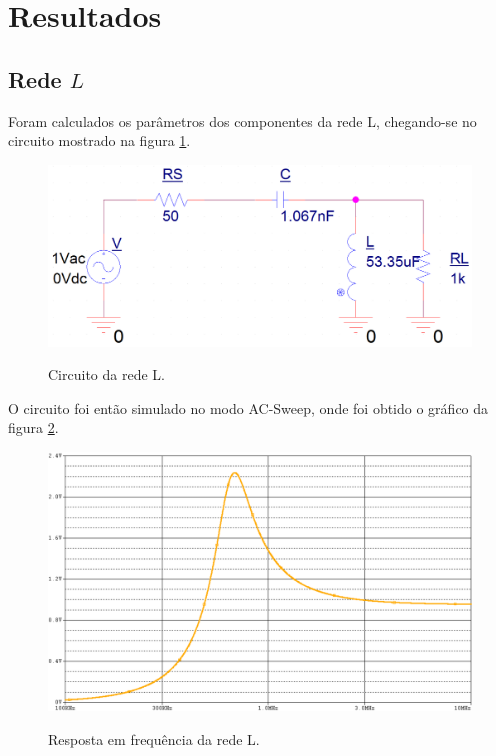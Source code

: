 \newpage
\section{Resultados}

\subsection{Rede $L$}

Foram calculados os parâmetros dos componentes da rede L, chegando-se no circuito mostrado na figura \ref{f_sch_rede_L}.

\begin{figure}[H]
    \centering
    \caption{Circuito da rede L.}
    \includegraphics[scale=0.4]{Imagens/sch_rede_L.png}
    \label{f_sch_rede_L}
\end{figure}

O circuito foi então simulado no modo AC-Sweep, onde foi obtido o gráfico da figura \ref{f_rede_L_graph}.

\begin{figure}[H]
    \centering
    \caption{Resposta em frequência da rede L.}
    \includegraphics[scale=0.4]{Imagens/rede_L_graph.png}
    \label{f_rede_L_graph}
\end{figure}

